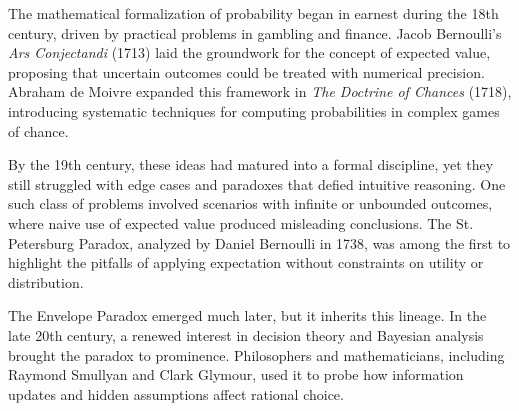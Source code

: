 \begin{historical}
The mathematical formalization of probability began in earnest during the 18th century, driven by practical problems in gambling and finance. Jacob Bernoulli’s \textit{Ars Conjectandi} (1713) laid the groundwork for the concept of expected value, proposing that uncertain outcomes could be treated with numerical precision. Abraham de Moivre expanded this framework in \textit{The Doctrine of Chances} (1718), introducing systematic techniques for computing probabilities in complex games of chance.

By the 19th century, these ideas had matured into a formal discipline, yet they still struggled with edge cases and paradoxes that defied intuitive reasoning. One such class of problems involved scenarios with infinite or unbounded outcomes, where naive use of expected value produced misleading conclusions. The St. Petersburg Paradox, analyzed by Daniel Bernoulli in 1738, was among the first to highlight the pitfalls of applying expectation without constraints on utility or distribution. 

The Envelope Paradox emerged much later, but it inherits this lineage. In the late 20th century, a renewed interest in decision theory and Bayesian analysis brought the paradox to prominence. Philosophers and mathematicians, including Raymond Smullyan and Clark Glymour, used it to probe how information updates and hidden assumptions affect rational choice.
\end{historical}
